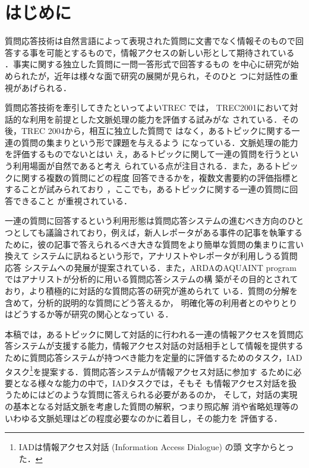 \documentclass[japanese]{jnlp_1.4}
\begin{document}
\maketitle


\section{はじめに}

質問応答技術は自然言語によって表現された質問に文書でなく情報そのもので回
答する事を可能とするもので，情報アクセスの新しい形として期待されている
\cite{Voorhees00}．事実に関する独立した質問に一問一答形式で回答するもの
を中心に研究が始められたが，近年は様々な面で研究の展開が見られ，そのひと
つに対話性の重視があげられる．

質問応答技術を牽引してきたといってよいTREC \cite{Voorhees05,TREC}では，
TREC2001において対話的な利用を前提とした文脈処理の能力を評価する試みがな
されている\cite{Voorhees01}．その後，TREC 2004から，相互に独立した質問で
はなく，あるトピックに関する一連の質問の集まりという形で課題を与えるよう
になっている\cite{Voorhees04}．文脈処理の能力を評価するものでないとはい
え，あるトピックに関して一連の質問を行うという利用場面が自然であると考え
られている点が注目される．また，あるトピックに関する複数の質問にどの程度
回答できるかを，複数文書要約の評価指標とすることが試みられており
\cite{Mani98}，ここでも，あるトピックに関する一連の質問に回答できること
が重視されている．

一連の質問に回答するという利用形態は質問応答システムの進むべき方向のひと
つとしても議論されており，例えば，新人レポータがある事件の記事を執筆する
ために，彼の記事で答えられるべき大きな質問をより簡単な質問の集まりに言い換えて
システムに訊ねるという形で，アナリストやレポータが利用しうる質問応答
システムへの発展が提案されている\cite{Burger01}．また，ARDAのAQUAINT
program \cite{AQUAINT}ではアナリストが分析的に用いる質問応答システムの構
築がその目的とされており，より積極的に対話的な質問応答の研究が進められて
いる．質問の分解を含めて，分析的説明的な質問にどう答えるか，
明確化等の利用者とのやりとりはどうするか等が研究の関心となってい
る\cite{Hickl04,Small03}．

本稿では，あるトピックに関して対話的に行われる一連の情報アクセスを質問応
答システムが支援する能力，情報アクセス対話の対話相手として情報を提供する
ために質問応答システムが持つべき能力を定量的に評価するためのタスク，IAD 
タスク\footnote{
	IADは情報アクセス対話 (Information Access Dialogue) の頭
	文字からとった．
}を提案する．質問応答システムが情報アクセス対話に参加す
るために必要となる様々な能力\cite{Burger01}の中で，IADタスクでは，そもそ
も情報アクセス対話を扱うためにはどのような質問に答えられる必要があるのか，
そして，対話の実現の基本となる対話文脈を考慮した質問の解釈，つまり照応解
消や省略処理等のいわゆる文脈処理はどの程度必要なのかに着目し，その能力を
評価する．
\end{document}
